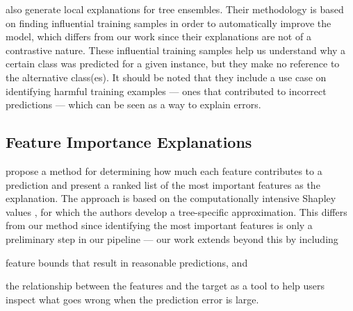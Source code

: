 \citet{sharchilev-2018-finding} also generate local explanations for tree ensembles. 
Their methodology is based on finding influential training samples in order to automatically improve the model, which differs from our work since their explanations are not of a contrastive nature. 
These influential training samples help us understand why a certain class was predicted for a given instance, but they make no reference to the alternative class(es). 
It should be noted that they include a use case on identifying harmful training examples --- ones that contributed to incorrect predictions --- which can be seen as a way to explain errors. 

\subsection{Feature Importance Explanations}

\citet{lundberg_explainable_2019} propose a method for determining how much each feature contributes to a prediction and present a ranked list of the most important features as the explanation. 
The approach is based on the computationally intensive Shapley values \citep{lundberg_unified_2017}, for which the authors develop a tree-specific approximation. 
This differs from our method since identifying the most important features is only a preliminary step in our pipeline --- our work extends beyond this by including
\begin{inparaenum}[(i)]
\item feature bounds that result in reasonable predictions, and 
\item the relationship between the features and the target as a tool to help users inspect what goes wrong when the prediction error is large.
\end{inparaenum}

